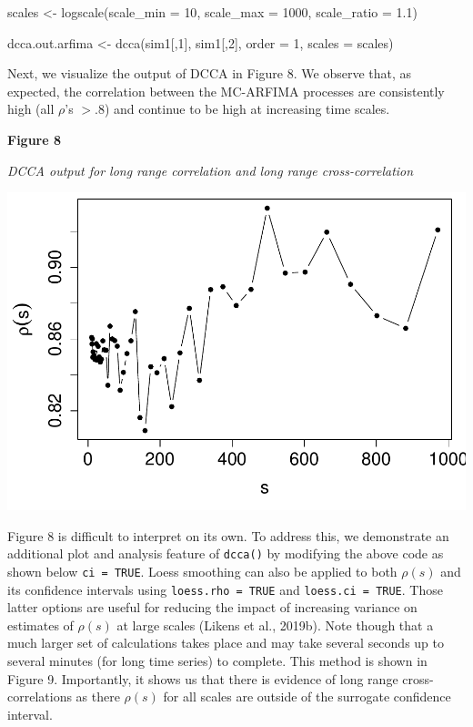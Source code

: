 \documentclass[
  man]{apa6}
\newenvironment{Shaded}{\begin{snugshade}}{\end{snugshade}}
\newcommand{\AttributeTok}[1]{\textcolor[rgb]{0.77,0.63,0.00}{#1}}
\newcommand{\DecValTok}[1]{\textcolor[rgb]{0.00,0.00,0.81}{#1}}
\newcommand{\FloatTok}[1]{\textcolor[rgb]{0.00,0.00,0.81}{#1}}
\newcommand{\FunctionTok}[1]{\textcolor[rgb]{0.00,0.00,0.00}{#1}}
\newcommand{\NormalTok}[1]{#1}
\newcommand{\OtherTok}[1]{\textcolor[rgb]{0.56,0.35,0.01}{#1}}
\begin{document}
\begin{Shaded}
\begin{Highlighting}[]
\NormalTok{scales }\OtherTok{\textless{}{-}} \FunctionTok{logscale}\NormalTok{(}\AttributeTok{scale\_min =} \DecValTok{10}\NormalTok{, }\AttributeTok{scale\_max =} \DecValTok{1000}\NormalTok{, }\AttributeTok{scale\_ratio =} \FloatTok{1.1}\NormalTok{)}

\NormalTok{dcca.out.arfima }\OtherTok{\textless{}{-}} \FunctionTok{dcca}\NormalTok{(sim1[,}\DecValTok{1}\NormalTok{], sim1[,}\DecValTok{2}\NormalTok{], }\AttributeTok{order =} \DecValTok{1}\NormalTok{, }\AttributeTok{scales =}\NormalTok{ scales)}
\end{Highlighting}
\end{Shaded}

Next, we visualize the output of DCCA in Figure 8. We observe that, as
expected, the correlation between the MC-ARFIMA processes are
consistently high (all \(\rho\)'s \(> .8\)) and continue to be high at
increasing time scales.

\textbf{Figure 8}

\emph{DCCA output for long range correlation and long range
cross-correlation}

\includegraphics{fractal_regression_paper_brm_files/figure-latex/unnamed-chunk-17-1.pdf}

Figure 8 is difficult to interpret on its own. To address this, we
demonstrate an additional plot and analysis feature of \texttt{dcca()} by
modifying the above code as shown below \texttt{ci\ =\ TRUE}. Loess smoothing can
also be applied to both \(\rho(s)\) and its confidence intervals using
\texttt{loess.rho\ =\ TRUE} and \texttt{loess.ci\ =\ TRUE}. Those latter options are
useful for reducing the impact of increasing variance on estimates of
\(\rho(s)\) at large scales (Likens et al., 2019b). Note though that a much larger
set of calculations takes place and may take several seconds up to
several minutes (for long time series) to complete. This method is shown
in Figure 9. Importantly, it shows us that there is evidence of long
range cross-correlations as there \(\rho(s)\) for all scales are outside
of the surrogate confidence interval.
\end{document}
